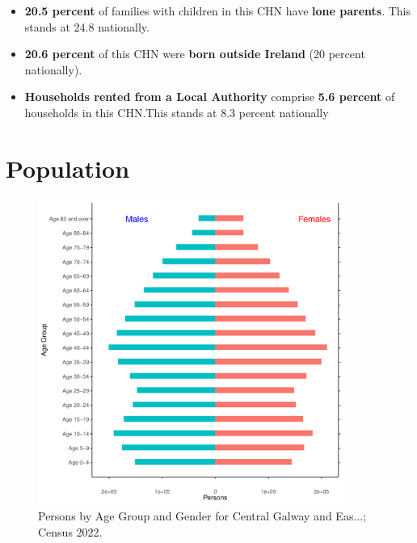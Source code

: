 \documentclass{article}
\begin{document}
\begin{itemize}
\item \textbf{20.5 percent} of families with children in this CHN have \textbf{lone parents}. This stands at 24.8 nationally.

\item \textbf{20.6 percent} of this CHN were \textbf{born outside Ireland} (20 percent nationally).

\item \textbf{Households rented from a Local Authority} comprise \textbf{5.6 percent} of households in this CHN.This stands at 8.3 percent nationally

\end{itemize}

\pagebreak

\section{Population} 
\label{sect:Pop}

\begin{figure}[h]
	\centering
	\includegraphics[width = 100mm]{../figures/PyramidPlot.pdf}
	\caption{Persons by Age Group and Gender for Central Galway and Eas...; Census 2022.}
	\label{fig:2ae19629-1a6a-13a3-e055-000000000001}
	\end{figure}
\end{document}
